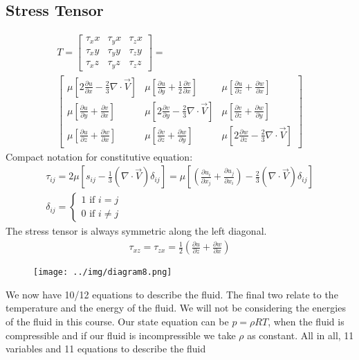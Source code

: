 \documentclass[class=report, crop=false, 12pt,a4paper]{standalone}
\begin{document}
\subsection{Stress Tensor}
\begin{gather}
  T = \begin{bmatrix}
    \tau_xx & \tau_yx & \tau_zx\\
    \tau_xy & \tau_yy & \tau_zy\\
    \tau_xz & \tau_yz & \tau_zz
  \end{bmatrix} = \\ 
  \begin{bmatrix}
    \mu \left[ 2 \frac{\partial u}{\partial x} - \frac{2}{3} \nabla \cdot \vec{V} \right] & \mu \left[ \frac{\partial u}{\partial y} + \frac{1}{2} \frac{\partial v}{\partial x} \right] & \mu \left[ \frac{\partial u}{\partial z} + \frac{\partial w}{\partial x} \right]\\
    \mu \left[ \frac{\partial u}{\partial y} + \frac{\partial v}{\partial x} \right] & \mu\left[ 2\frac{\partial v}{\partial y} - \frac{2}{3}\nabla \cdot \vec{V} \right] & \mu \left[ \frac{\partial v}{\partial z} + \frac{\partial w}{\partial y} \right] \\
    \mu \left[ \frac{\partial u}{\partial z} + \frac{\partial w}{\partial x} \right] & \mu \left[ \frac{\partial v}{\partial z} + \frac{\partial w}{\partial y} \right] & \mu \left[ 2\frac{\partial w}{\partial z} - \frac{2}{3}\nabla \cdot \vec{V} \right]
  \end{bmatrix}
\end{gather}
Compact notation for constitutive equation:
\begin{gather}
  \tau_{ij} = 2\mu \left[ s_{ij} - \frac{1}{3}(\nabla \cdot \vec{V}) \delta_{ij} \right] = \mu \left[ \left(\frac{\partial u_i}{\partial x_j} + \frac{\partial u_j}{\partial x_i} \right) - \frac{2}{3}(\nabla \cdot \vec{V}) \delta_{ij} \right]\\
  \delta_{ij} = \begin{cases}
    1 \textrm{ if } i = j\\
    0 \textrm{ if } i \neq j
  \end{cases} 
\end{gather}
The stress tensor is always symmetric along the left diagonal.
\begin{gather}
  \tau_{xz} = \tau_{zx} = \frac{1}{2} \left(\frac{\partial u}{\partial z} + \frac{\partial w}{\partial x} \right)
\end{gather}
\begin{figure}[H]
  \centering
  \texttt{[image: ../img/diagram8.png]}
\end{figure}
We now have 10/12 equations to describe the fluid. The final two relate to the temperature and the energy of the fluid. We will not be considering the energies of the fluid in this course. Our state equation can be $p = \rho RT$, when the fluid is compressible and if our fluid is incompressible we take $\rho$ as constant. All in all, 11 variables and 11 equations to describe the fluid
\end{document}
